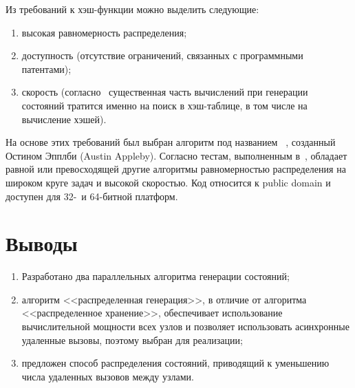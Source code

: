 Из требований к хэш-функции можно выделить следующие:
\begin{enumerate}
\item высокая равномерность распределения;
\item доступность (отсутствие ограничений, связанных с программными патентами);
\item скорость (согласно~\cite{LS99,BitHash1} существенная часть вычислений при генерации
  состояний тратится именно на поиск в хэш-таблице, в том числе на вычисление хэшей).
\end{enumerate}

На основе этих требований был выбран алгоритм под названием
~\cite{Murmur}, созданный Остином Эпплби (Austin Appleby). Согласно
тестам, выполненным в~\cite{Murmur},  обладает равной или превосходящей
другие алгоритмы равномерностью распределения на широком круге задач и высокой
скоростью. Код относится к public domain и доступен для 32-~и 64-битной платформ.

\section*{Выводы}

\begin{enumerate}
\item Разработано два параллельных алгоритма генерации состояний;
\item алгоритм <<распределенная генерация>>, в отличие от алгоритма <<распределенное
  хранение>>, обеспечивает использование вычислительной мощности всех узлов и позволяет
  использовать асинхронные удаленные вызовы, поэтому выбран для реализации;
\item предложен способ распределения состояний, приводящий к уменьшению числа удаленных
  вызовов между узлами.
\end{enumerate}

